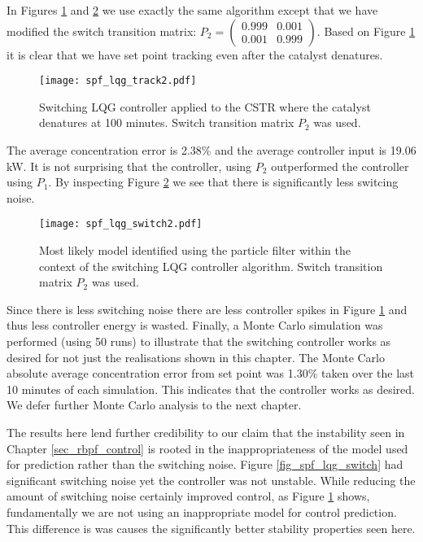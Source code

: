 In Figures \ref{fig_spf_lqg_track2} and \ref{fig_spf_lqg_switch2} we use exactly the same algorithm except that we have modified the switch transition matrix: $P_2=\begin{pmatrix}
0.999 & 0.001 \\ 0.001 & 0.999
\end{pmatrix}$. Based on Figure \ref{fig_spf_lqg_track2} it is clear that we have set point tracking even after the catalyst denatures.
\begin{figure}[H] 
\centering
\texttt{[image: spf\_lqg\_track2.pdf]}
\caption{Switching LQG controller applied to the CSTR where the catalyst denatures at 100 minutes. Switch transition matrix $P_2$ was used.}
\label{fig_spf_lqg_track2}
\end{figure}
The average concentration error is 2.38\% and the average controller input is 19.06 kW. It is not surprising that the controller, using $P_2$ outperformed the controller using $P_1$. By inspecting Figure \ref{fig_spf_lqg_switch2} we see that there is significantly less switcing noise.  
\begin{figure}[H] 
\centering
\texttt{[image: spf\_lqg\_switch2.pdf]}
\caption{Most likely model identified using the particle filter within the context of the switching LQG controller algorithm. Switch transition matrix $P_2$ was used.}
\label{fig_spf_lqg_switch2}
\end{figure}
Since there is less switching noise there are less controller spikes in Figure \ref{fig_spf_lqg_track2} and thus less controller energy is wasted. Finally, a Monte Carlo simulation was performed (using 50 runs) to illustrate that the switching controller works as desired for not just the realisations shown in this chapter. The Monte Carlo absolute average concentration error from set point was 1.30\% taken over the last 10 minutes of each simulation. This indicates that the controller works as desired. We defer further Monte Carlo analysis to the next chapter.

The results here lend further credibility to our claim that the instability seen in Chapter \ref{sec_rbpf_control} is rooted in the inappropriateness of the model used for prediction rather than the switching noise. Figure \ref{fig_spf_lqg_switch} had significant switching noise yet the controller was not unstable. While reducing the amount of switching noise certainly improved control, as Figure \ref{fig_spf_lqg_track2} shows, fundamentally we are not using an inappropriate model for control prediction. This difference is was causes the significantly better stability properties seen here.


